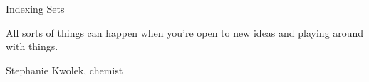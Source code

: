 \begin{section}{Indexing Sets}
\epigraph{All sorts of things can happen when you're open to new ideas and playing around with things.}{Stephanie Kwolek, chemist}

\end{section}
